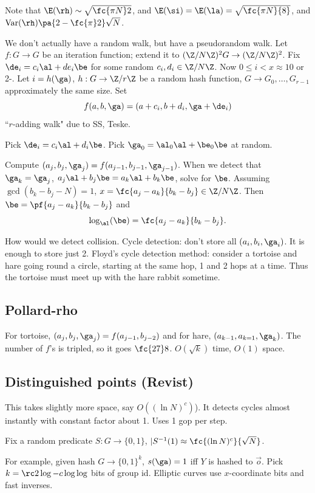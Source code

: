 Note that $\E(\rh)\sim\sqrt{\fc{\pi N}2}$, and $\E(\si)=\E(\la)=\sqrt{\fc{\pi N}{8}}$, and $\text{Var}(\rh)\pa{2-\fc{\pi}2}\sqrt N$.

We don't actually have a random walk, but have a pseudorandom walk. %
Let $f:G\to G$ be an iteration function; extend it to $(\Z/N\Z)^2G\to (\Z/N\Z)^2$. 
Fix $\de_i=c_i\al+de_i\be$ for some random $c_i, d_i\in \Z/N\Z$. 
Now $0\le i<x\approx 10$ or 2-. 
Let $i=h(\ga)$, $h:G\to \Z/r\Z$ be a random hash function, 
$G\to G_0,\ldots, G_{r-1}$ approximately the same size.
Set
\[
f(a,b,\ga)=(a+c_i,b+d_i,\ga+\de_i)
\]
``$r$-adding walk" due to SS, Teske.
\begin{alg}
Pick $\de_i=c_i\al+d_i\be$. 
Pick $\ga_0=\al_0\al+\be_0\be$ at random.

Compute $(a_j,b_j,\ga_j)=f(a_{j-1},b_{j-1},\ga_{j-1})$. When we detect that $\ga_k=\ga_j$, $a_j\al +b_j\be = a_k \al +b_k\be$, solve for $\be$. Assuming %
$\gcd(b_k-b_j-N)=1$, $x=\fc{a_j-a_k}{b_k-b_j}\in \Z/N\Z$. Then $\be=\pf{a_j-a_k}{b_k-b_j}$ and
\[
\log_{\al}(\be)=\fc{a_j-a_k}{b_k-b_j}.
\]

\end{alg}
How would we detect collision. %
Cycle detection: don't store all $(a_i,b_i,\ga_i)$. It is enough to store just 2. Floyd's cycle detection method: consider a tortoise and hare going round a circle, starting at the same hop, 1 and 2 hops at a time. Thus the tortoise must meet up with the hare rabbit sometime.
\subsection{Pollard-rho}
For tortoise, $(a_j,b_j,\ga_j)=f(a_{j-1},b_{j-2})$ and for hare, $(a_{k-1},a_{k=1},\ga_k)$. The number of $f$'s is tripled, so it goes $\fc{27}8$.
$O(\sqrt k)$ time, $O(1)$ space.

\subsection{Distinguished points (Revist)} 
This takes slightly more space, say $O((\ln N)^c)$). It detects cycles almost instantly with constant factor about 1. Uses 1 gop per step.

Fix a random predicate $S:G\to \{0,1\}$, $|S^{-1}(1)\approx \fc{(\ln N)^c}{\sqrt N}$. 

For example, given hash $G\to \{0,1\}^k$, $s(\ga)=1$ iff $Y$ is hashed to $\vec o$. Pick $k=\rc 2\log-c\log\log$ bits of group id. Elliptic curves use $x$-coordinate bits and fast inverses.

